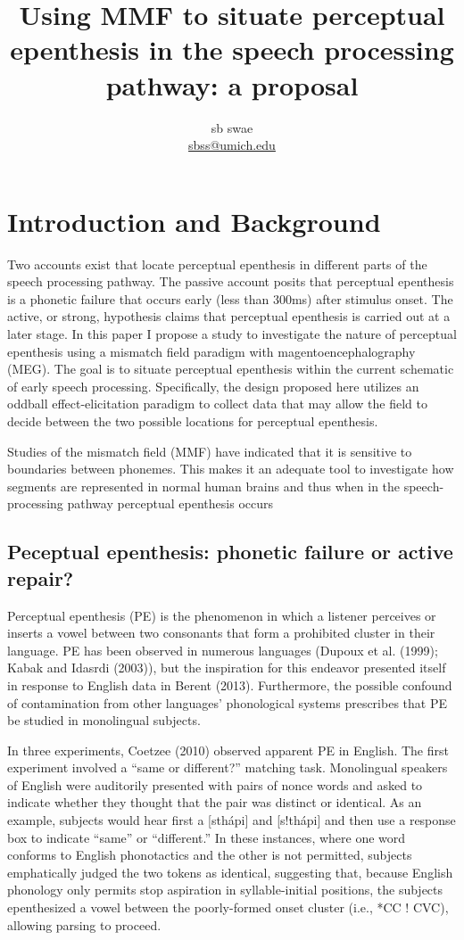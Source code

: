 \documentclass[jou,apacite]{apa6}
\title{Using MMF to situate perceptual epenthesis in the speech processing pathway: a proposal}
\author{sb swae\\\href{mailto:sbss@umich.edu}{sbss@umich.edu}}
\begin{document}
\maketitle

\section{Introduction and Background}
    Two accounts exist that locate perceptual epenthesis in different parts of the speech processing pathway. The passive account posits that perceptual epenthesis is a phonetic failure that occurs early (less than 300ms) after stimulus onset. The active, or strong, hypothesis claims that perceptual epenthesis is carried out at a later stage. In this paper I propose a study to investigate the nature of perceptual epenthesis using a mismatch field paradigm with magentoencephalography (MEG). The goal is to situate perceptual epenthesis within the current schematic of early speech processing. Specifically, the design proposed here utilizes an oddball effect-elicitation paradigm to collect data that may allow the field to decide between the two possible locations for perceptual epenthesis.

    Studies of the mismatch field (MMF) have indicated that it is sensitive to boundaries between phonemes. This makes it an adequate tool to investigate how segments are represented in normal human brains and thus when in the speech-processing pathway perceptual epenthesis occurs

    \subsection{Peceptual epenthesis: phonetic failure or active repair?}
    Perceptual epenthesis (PE) is the phenomenon in which a listener perceives or inserts a vowel between two consonants that form a prohibited cluster in their language. PE has been observed in numerous languages (Dupoux et al. (1999); Kabak and Idasrdi (2003)), but the inspiration for this endeavor presented itself in response to English data in Berent (2013). Furthermore, the possible confound of contamination from other languages’ phonological systems prescribes that PE be studied in monolingual subjects.

    In three experiments, Coetzee (2010) observed apparent PE in English. The first experiment involved a “same or different?” matching task. Monolingual speakers of English were auditorily presented with pairs of nonce words and asked to indicate whether they thought that the pair was distinct or identical. As an example, subjects would hear first a [sthápi] and [s!thápi] and then use a response box to indicate “same” or “different.” In these instances, where one word conforms to English phonotactics and the other is not permitted, subjects emphatically judged the two tokens as identical, suggesting that, because English phonology only permits stop aspiration in syllable-initial positions, the subjects epenthesized a vowel between the poorly-formed onset cluster (i.e., *CC ! CVC), allowing parsing to proceed.
\end{document}
